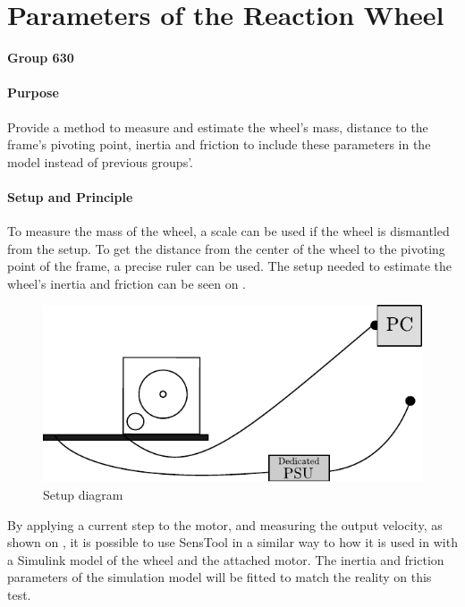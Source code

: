 \chapter{Parameters of the Reaction Wheel}\label{app:wheelParameters} 
\textbf{Group 630}\\

\subsubsection{Purpose}
Provide a method to measure and estimate the wheel's mass, distance to the frame's pivoting point, inertia and friction to include these parameters in the model instead of previous groups'.

\subsubsection{Setup and Principle}

To measure the mass of the wheel, a scale can be used if the wheel is dismantled from the setup. To get the distance from the center of the wheel to the pivoting point of the frame, a precise ruler can be used.
The setup needed to estimate the wheel's inertia and friction can be seen on .
\begin{figure}[H]
  \centering
  \includegraphics[scale=1]{figures/wheelParameterTestSetup}
  \caption{Setup diagram}
  \label{fig:wheelParameterTestSetup}
\end{figure}

By applying a current step to the motor, and measuring the output velocity, as shown on , it is possible to use SensTool in a similar way to how it is used in  with a Simulink model of the wheel and the attached motor. The inertia and friction parameters of the simulation model will be fitted to match the reality on this test.

